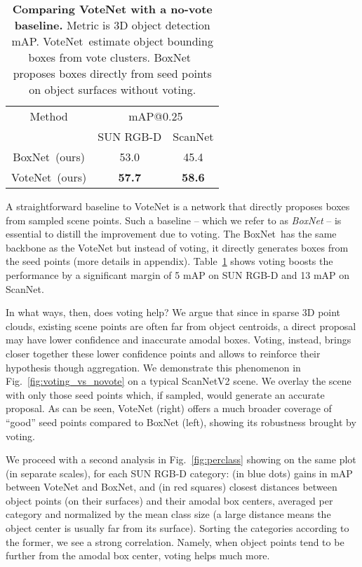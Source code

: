 \documentclass[10pt,twocolumn,letterpaper]{article}
\newcommand\boxnet{BoxNet}
\newcommand\votenet{VoteNet}
\begin{document}
\begin{table}[t!]
    \small
    \begin{center}
    \begin{tabular}{c|cc}
    \toprule
        Method & \multicolumn{2}{c}{mAP@0.25} \\
        & SUN RGB-D & ScanNet \\ \midrule
\boxnet~(ours) & 53.0 & 45.4 \\ \midrule
        \votenet~(ours) & \textbf{57.7} & \textbf{58.6} \\
        \bottomrule
    \end{tabular}
    \end{center}
    \caption{\textbf{Comparing \votenet{} with a no-vote baseline.} Metric is 3D object detection mAP. \votenet~estimate object bounding boxes from vote clusters. \boxnet~ proposes boxes directly from seed points on object surfaces without voting.}
    \label{tab:vote_or_not}
\end{table}

A straightforward baseline to \votenet{} is a network that directly proposes boxes from sampled scene points. Such a baseline -- which we refer to as \emph{\boxnet{}} -- is essential to distill the improvement due to voting. The \boxnet~has the same backbone as the \votenet{} but instead of voting, it directly generates boxes from the seed points (more details in appendix). Table~\ref{tab:vote_or_not} shows voting boosts the performance by a significant margin of 5 mAP on SUN RGB-D and 13 mAP on ScanNet.



In what ways, then, does voting help? We argue that since in sparse 3D point clouds, existing scene points are often far from object centroids, a direct proposal may have lower confidence and inaccurate amodal boxes. Voting, instead, brings closer together these lower confidence points and allows to reinforce their hypothesis though aggregation. We demonstrate this phenomenon in Fig.~\ref{fig:voting_vs_novote} on a typical ScanNetV2 scene. We overlay the scene with only those seed points which, if sampled, would generate an accurate proposal. As can be seen, \votenet{} (right) offers a much broader coverage of ``good'' seed points compared to \boxnet{} (left), showing its robustness brought by voting.

We proceed with a second analysis in Fig.~\ref{fig:perclass} showing on the same plot (in separate scales), for each SUN RGB-D category: (in blue dots) gains in mAP between \votenet{} and \boxnet{}, and (in red squares) closest distances between object points (on their surfaces) and their amodal box centers, averaged per category and normalized by the mean class size (a large distance means the object center is usually far from its surface). Sorting the categories according to the former, we see a strong correlation. Namely, when object points tend to be further from the amodal box center, voting helps much more.
\end{document}
